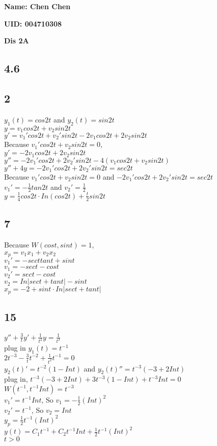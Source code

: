 \documentclass[12pt, a4paper]{IEEEtran}
\begin{document}
    \centerline{\textbf{Name: Chen Chen}}
    \centerline{\textbf{UID: 004710308}}
    \centerline{\textbf{Dis 2A}}
    \begin{flushleft}
    
    
    \section{4.6}
    \subsection{2}
    $y_1(t)=cos2t$ and $y_2(t)=sin2t$\\
    $y=v_1cos2t+v_2sin2t$\\
    $y'=v_1'cos2t+v_2'sin2t-2v_1cos2t+2v_2sin2t$\\
    Because $v_1'cos2t+v_2sin2t=0$,\\
    $y'=-2v_1cos2t+2v_2sin2t$\\
    $y''=-2v_1'cos2t+2v_2'sin2t-4(v_1cos2t+v_2sin2t)$\\
    $y''+4y=-2v_1'cos2t+2v_2'sin2t=sec2t$\\
    Because $v_1'cos2t+v_2sin2t=0$ and $-2v_1'cos2t+2v_2'sin2t=sec2t$\\
    $v_1'=-\frac{1}{2}tan2t$ and $v_2'=\frac{1}{2}$\\
    $y=\frac{1}{4}cos2t\cdot In(cos2t)+\frac{t}{2}sin2t$\\
    
    \subsection{7}
    Because $W(cost, sint)=1$,\\
    $x_p=v_1x_1+v_2x_2$\\
    $v_1'=-secttant+sint$\\
    $v_1=-sect-cost$\\
    $v_2'=sect-cost$\\
    $v_2=In|sect+tant|-sint$\\
    $x_p=-2+sint\cdot In|sect+tant|$\\
    
    \subsection{15}
    $y''+\frac{3}{t}y'+\frac{1}{t^2}y=\frac{1}{t^3}$\\
    plug in $y_1(t)=t^{-1}$\\
    $2t^{-3}-\frac{3}{t}t^{-2}+\frac{1}{t^2}t^{-1}=0$\\
    $y_2(t)'=t^{-2}(1-Int)$ and $y_2(t)''=t^{-3}(-3+2Int)$\\
    plug in, $t^{-3}(-3+2Int)+3t^{-3}(1-Int)+t^{-3}Int=0$\\
    $W(t^{-1}, t^{-1}Int)=t^{-3}$\\
    $v_1'=t^{-1}Int$, So $v_1=-\frac{1}{2}(Int)^2$\\
    $v_2'=t^{-1}$, So $v_2=Int$\\
    $y_p=\frac{1}{2}t^{-1}(Int)^2$\\
    $y(t)=C_1t^{-1}+C_2t^{-1}Int+\frac{1}{2}t^{-1}(Int)^2$\\
    $t>0$\\
    


\end{flushleft}
\end{document}
